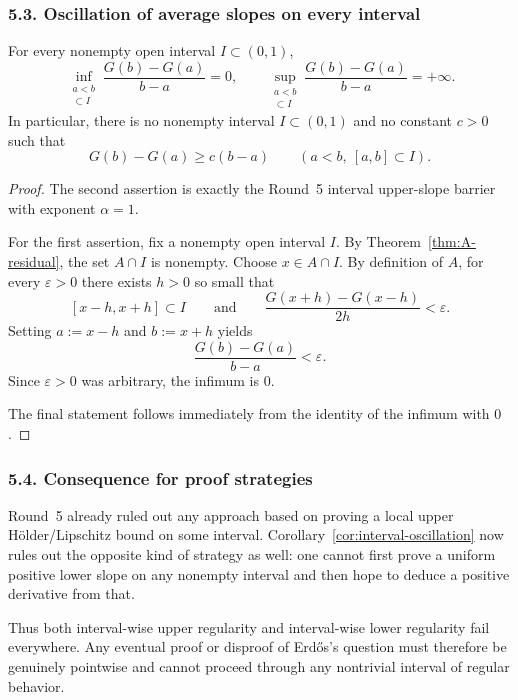 \subsubsection*{5.3. Oscillation of average slopes on every interval}

\begin{corollary}\label{cor:interval-oscillation}
For every nonempty open interval $I\subset(0,1)$,
\[
\inf_{\substack{a<b\\ [a,b]\subset I}}\frac{G(b)-G(a)}{b-a}=0,
\qquad
\sup_{\substack{a<b\\ [a,b]\subset I}}\frac{G(b)-G(a)}{b-a}=+\infty.
\]
In particular, there is no nonempty interval $I\subset(0,1)$ and no constant $c>0$ such that
\[
G(b)-G(a)\ge c(b-a)
\qquad(a<b,\ [a,b]\subset I).
\]
\end{corollary}

\begin{proof}
The second assertion is exactly the Round~5 interval upper-slope barrier with exponent $\alpha=1$.

For the first assertion, fix a nonempty open interval $I$. By Theorem~\ref{thm:A-residual}, the set $A\cap I$ is nonempty. Choose $x\in A\cap I$.
By definition of $A$, for every $\varepsilon>0$ there exists $h>0$ so small that
\[
[x-h,x+h]\subset I
\qquad\text{and}\qquad
\frac{G(x+h)-G(x-h)}{2h}<\varepsilon.
\]
Setting $a:=x-h$ and $b:=x+h$ yields
\[
\frac{G(b)-G(a)}{b-a}<\varepsilon.
\]
Since $\varepsilon>0$ was arbitrary, the infimum is $0$.

The final statement follows immediately from the identity of the infimum with $0$.
\end{proof}

\subsubsection*{5.4. Consequence for proof strategies}

Round~5 already ruled out any approach based on proving a local upper H\"older/Lipschitz bound on some interval. Corollary~\ref{cor:interval-oscillation} now rules out the opposite kind of strategy as well: one cannot first prove a uniform positive lower slope on any nonempty interval and then hope to deduce a positive derivative from that.

Thus both interval-wise upper regularity and interval-wise lower regularity fail everywhere. Any eventual proof or disproof of Erd\H{o}s's question must therefore be genuinely pointwise and cannot proceed through any nontrivial interval of regular behavior.

